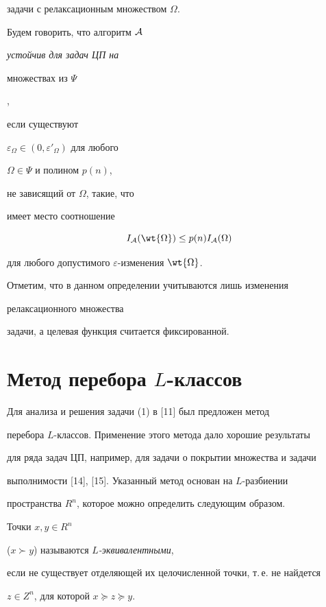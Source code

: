 задачи с релаксационным множеством $ \Omega$.  


Будем говорить, что алгоритм ${ \cal A}$ {\it устойчив для задач ЦП на 


множествах из $\Psi$},


если существуют


$ \varepsilon_{ \Omega} \in (0, \varepsilon'_{ \Omega})$ для любого


$\Omega \in \Psi$ и полином $p(n)$, 


не зависящий от $ \Omega$, такие, что  


имеет место  соотношение


$$


I_{{ \cal A}}( \wt{ \Omega}) \leq p(n)I_{{ \cal A}}( \Omega)


$$


для любого  допустимого $ \varepsilon$-изменения $ \wt{ \Omega}$.





Отметим, что в данном определении учитываются  лишь изменения 


релаксационного множества


задачи, а целевая функция считается фиксированной.








\section{Метод перебора $L$-классов}





Для анализа и решения задачи (1) в [11] был предложен метод


перебора $L$-классов. Применение этого метода дало хорошие результаты


для ряда задач ЦП, например, для задачи о покрытии множества и задачи 


выполнимости [14], [15]. Указанный метод основан на $L$-разбиении 


пространства $R^{n}$, которое можно определить следующим образом.


Точки $x,y \in R^{n}$


($x \succ y$) называются {\it $L$-эквивалентными},


если не существует отделяющей их целочисленной точки, т.\,е. не найдется


$z \in Z^{n}$,  для которой $x \succeq z \succeq y$.


